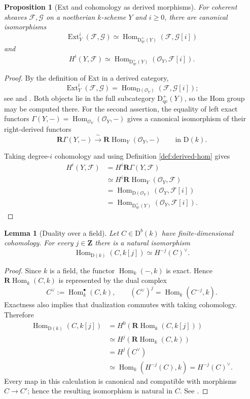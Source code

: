 \documentclass[11pt,a4paper]{article}
\newtheorem{proposition}[theorem]{Proposition}
\newtheorem{lemma}[theorem]{Lemma}
\theoremstyle{definition}
\theoremstyle{remark}
\newcommand{\OO}{\mathcal O}
\newcommand{\FF}{\mathcal F}
\newcommand{\GG}{\mathcal G}
\newcommand{\Hom}{\operatorname{Hom}}
\newcommand{\Ext}{\operatorname{Ext}}
\newcommand{\RHom}{\mathbf R\!\operatorname{Hom}}
\newcommand{\RGamma}{\mathbf R\Gamma}
\newcommand{\D}{\mathrm D}
\newcommand{\dual}{^{\vee}}
\begin{document}
\begin{proposition}[Ext and cohomology as derived morphisms]
\label{prop:ext-derived}
For coherent sheaves $\FF,\GG$ on a noetherian $k$-scheme $Y$ and $i\geq0$,
there are canonical isomorphisms
\[
  \Ext_Y^i(\FF,\GG)
  \simeq \Hom_{\D^+_{\mathrm{qc}}(Y)}(\FF,\GG[i])
\]
and
\[
  H^i(Y,\FF)
  \simeq \Hom_{\D^+_{\mathrm{qc}}(Y)}(\OO_Y,\FF[i]).
\]
\end{proposition}

\begin{proof}
By the definition of Ext in a derived category,
\[
  \Ext_Y^i(\FF,\GG)=\Hom_{\D(\OO_Y)}(\FF,\GG[i]);
\]
see \cite[Section 10.7]{Weibel} and \cite[Tags 06XQ and 06XP]{Stacks}.
Both objects lie in the full subcategory $\D^+_{\mathrm{qc}}(Y)$, so the Hom
group may be computed there. For the second assertion, the equality of left
exact functors
$\Gamma(Y,-)=\Hom_{\OO_Y}(\OO_Y,-)$ gives a canonical isomorphism of their
right-derived functors
\[
  \RGamma(Y,-)
  \xrightarrow{\ \sim\ }
  \RHom_Y(\OO_Y,-)
  \qquad\text{in }\D(k).
\]

Taking degree-$i$ cohomology and using Definition \ref{def:derived-hom} gives
\begin{align*}
  H^i(Y,\FF)
  &=H^i\RGamma(Y,\FF)\\
  &\simeq H^i\RHom_Y(\OO_Y,\FF)\\
  &=\Hom_{\D(\OO_Y)}(\OO_Y,\FF[i])\\
  &=\Hom_{\D^+_{\mathrm{qc}}(Y)}(\OO_Y,\FF[i]).
\end{align*}
\end{proof}

\begin{lemma}[Duality over a field]
\label{lem:field-duality}
Let $C\in\D^b(k)$ have finite-dimensional cohomology. For every
$j\in\mathbf Z$ there is a natural isomorphism
\[
  \Hom_{\D(k)}(C,k[j])\simeq H^{-j}(C)\dual.
\]
\end{lemma}

\begin{proof}
Since $k$ is a field, the functor $\Hom_k(-,k)$ is exact. Hence
$\RHom_k(C,k)$ is represented by the dual complex
\[
  C^\vee:=\Hom_k^\bullet(C,k),
  \qquad
  (C^\vee)^j=\Hom_k(C^{-j},k).
\]
Exactness also implies that dualization commutes with taking cohomology.
Therefore
\begin{align*}
  \Hom_{\D(k)}(C,k[j])
    &=H^0\!\left(\RHom_k(C,k[j])\right)\\
    &\simeq H^j\!\left(\RHom_k(C,k)\right)\\
    &=H^j(C^\vee)\\
    &\simeq\Hom_k\!\left(H^{-j}(C),k\right)
     =H^{-j}(C)^\vee.
\end{align*}
Every map in this calculation is canonical and compatible with morphisms
$C\to C'$; hence the resulting isomorphism is natural in $C$. See
\cite[Sections 10.4 and 10.7]{Weibel}.
\end{proof}
\end{document}
